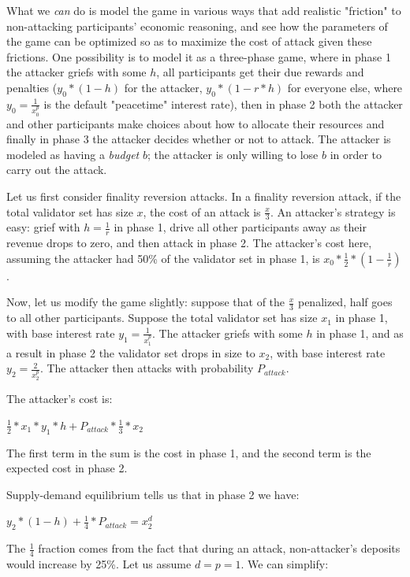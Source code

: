 \documentclass[12pt]{article}
\begin{document}
What we \textit{can} do is model the game in various ways that add realistic "friction" to non-attacking participants' economic reasoning, and see how the parameters of the game can be optimized so as to maximize the cost of attack given these frictions. One possibility is to model it as a three-phase game, where in phase 1 the attacker griefs with some $h$, all participants get their due rewards and penalties ($y_0 * (1 - h)$ for the attacker, $y_0 * (1- r * h)$ for everyone else, where $y_0 = \frac{1}{x_0^p}$ is the default "peacetime" interest rate), then in phase 2 both the attacker and other participants make choices about how to allocate their resources and finally in phase 3 the attacker decides whether or not to attack. The attacker is modeled as having a \textit{budget} $b$; the attacker is only willing to lose $b$ in order to carry out the attack.

Let us first consider finality reversion attacks. In a finality reversion attack, if the total validator set has size $x$, the cost of an attack is $\frac{x}{3}$. An attacker's strategy is easy: grief with $h = \frac{1}{r}$ in phase 1, drive all other participants away as their revenue drops to zero, and then attack in phase 2. The attacker's cost here, assuming the attacker had 50\% of the validator set in phase 1, is $x_0 * \frac{1}{2} * (1 - \frac{1}{r})$.

Now, let us modify the game slightly: suppose that of the $\frac{x}{3}$ penalized, half goes to all other participants. Suppose the total validator set has size $x_1$ in phase 1, with base interest rate $y_1 = \frac{1}{x_1^p}$. The attacker griefs with some $h$ in phase 1, and as a result in phase 2 the validator set drops in size to $x_2$, with base interest rate $y_2 = \frac{2}{x_2^p}$. The attacker then attacks with probability $P_{attack}$.

The attacker's cost is:

$\frac{1}{2} * x_1 * y_1 * h + P_{attack} * \frac{1}{3} * x_2$

The first term in the sum is the cost in phase 1, and the second term is the expected cost in phase 2.

Supply-demand equilibrium tells us that in phase 2 we have:

$y_2 * (1-h) + \frac{1}{4} * P_{attack} = x_2^d$

The $\frac{1}{4}$ fraction comes from the fact that during an attack, non-attacker's deposits would increase by 25\%. Let us assume $d = p = 1$. We can simplify:
\end{document}
